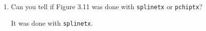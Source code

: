 \documentclass[10pt]{report}
\begin{document}
\begin{enumerate}
\begin{enumerate}
		\item 
		Can you tell if Figure 3.11 was done with \verb|splinetx| or \verb|pchiptx|?
		
		It was done with \verb|splinetx|.
	\end{enumerate}
\end{enumerate}
\end{document}
